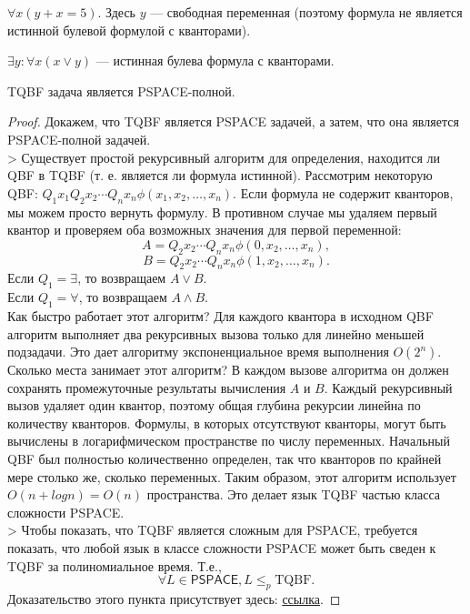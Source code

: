     \begin{Example}
        $\forall x (y + x = 5)$. Здесь $y$ --- свободная переменная (поэтому формула не является истинной булевой формулой с кванторами).
    \end{Example}
    
    \begin{Example}
        $\exists y : \forall x (x \vee y)$ --- истинная булева формула с кванторами.
    \end{Example}
    
    \begin{Thm}
        TQBF задача является PSPACE-полной.
    \end{Thm}
    
    \begin{proof}
        Докажем, что TQBF является PSPACE задачей, а затем, что она является PSPACE-полной задачей.\\
        > Существует простой рекурсивный алгоритм для определения, находится ли QBF в TQBF (т. е. является ли формула истинной). Рассмотрим некоторую QBF:
        $Q_{1}x_{1}Q_{2}x_{2}\cdots Q_{n}x_{n}\phi (x_{1},x_{2},\dots ,x_{n}).$
        Если формула не содержит кванторов, мы можем просто вернуть формулу. В противном случае мы удаляем первый квантор и проверяем оба возможных значения для первой переменной:
        $$A=Q_{2}x_{2}\cdots Q_{n}x_{n}\phi (0,x_{2},\dots ,x_{n}),$$
        $$B=Q_{2}x_{2}\cdots Q_{n}x_{n}\phi (1,x_{2},\dots ,x_{n}).$$
        Если $Q_{1}=\exists$, то возвращаем $A\lor B$.\\
        Если $Q_{1}=\forall$, то возвращаем $A\land B$.\\
        Как быстро работает этот алгоритм? Для каждого квантора в исходном QBF алгоритм выполняет два рекурсивных вызова только для линейно меньшей подзадачи. Это дает алгоритму экспоненциальное время выполнения $O(2^n)$.\\
        Сколько места занимает этот алгоритм? В каждом вызове алгоритма он должен сохранять промежуточные результаты вычисления $A$ и $B$. Каждый рекурсивный вызов удаляет один квантор, поэтому общая глубина рекурсии линейна по количеству кванторов. Формулы, в которых отсутствуют кванторы, могут быть вычислены в логарифмическом пространстве по числу переменных. Начальный QBF был полностью количественно определен, так что кванторов по крайней мере столько же, сколько переменных. Таким образом, этот алгоритм использует $O(n + log n) = O(n)$ пространства. Это делает язык TQBF частью класса сложности PSPACE.\\
        > Чтобы показать, что TQBF является сложным для PSPACE, требуется показать, что любой язык в классе сложности PSPACE может быть сведен к TQBF за полиномиальное время. Т.е.,
        $$\forall L\in {\mathsf{PSPACE}},L\leq _{p}\mathrm{TQBF} .$$
        Доказательство этого пункта присутствует здесь: \href{https://en.wikipedia.org/wiki/True_quantified_Boolean_formula}{ссылка}.
    \end{proof}
    
